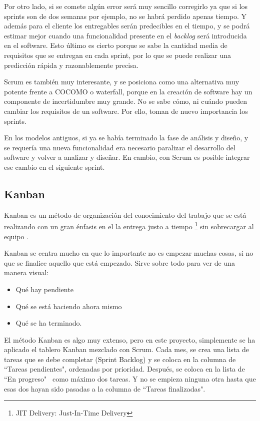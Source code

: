 Por otro lado, si se comete alg\'un error ser\'a muy sencillo corregirlo ya que si los sprints son de dos semanas por ejemplo, no 
se habr\'a perdido apenas tiempo. Y adem\'as para el cliente los entregables ser\'an predecibles en el tiempo, 
y se podr\'a estimar mejor cuando una funcionalidad presente en el \emph{backlog}
ser\'a introducida en el software. Esto \'ultimo es cierto porque se sabe la cantidad media de requisitos que se
entregan en cada sprint, por lo que se puede realizar una predicci\'on r\'apida y razonablemente precisa.

Scrum es tambi\'en muy interesante, y se posiciona como una alternativa muy potente frente a 
COCOMO o waterfall, porque en la creaci\'on de software hay un componente de incertidumbre muy 
grande. No se sabe c\'omo, ni cu\'ando pueden cambiar los requisitos de un 
software. Por ello, toman de nuevo importancia los sprints. 

En los modelos antiguos, si ya se hab\'ia terminado la fase de an\'alisis y dise\~no, y se requer\'ia una nueva funcionalidad era necesario 
paralizar el desarrollo del software y volver a analizar y diseñar. En cambio, con Scrum es 
posible integrar ese cambio en el siguiente sprint.

\subsection{Kanban}
Kanban es un m\'etodo de organizaci\'on del conocimiento del trabajo que se est\'a realizando con un gran \'enfasis en el la entrega justo a 
tiempo \footnote{JIT Delivery: Just-In-Time Delivery} sin sobrecargar al equipo \cite{Kanban:WhatIsIt}.

Kanban se centra mucho en que lo importante no es empezar muchas cosas, si no que se finalice
aquello que est\'a empezado. Sirve sobre todo 
para ver de una manera visual:
\begin{itemize}
	\item Qu\'e hay pendiente
	\item Qu\'e se est\'a haciendo ahora mismo
	\item Qu\'e se ha terminado.
\end{itemize}

El m\'{e}todo Kanban es algo muy extenso, pero en este proyecto, simplemente se ha aplicado el tablero Kanban mezclado con Scrum. 
Cada mes, se crea una lista de tareas que se debe completar (Sprint Backlog) y se coloca en la columna de ``Tareas pendientes", 
ordenadas por prioridad. Despu\'es, se coloca en la lista de ``En progreso" \ como m\'{a}ximo dos tareas. Y no se empieza ninguna otra
hasta que esas dos hayan sido pasadas a la columna de ``Tareas finalizadas".

